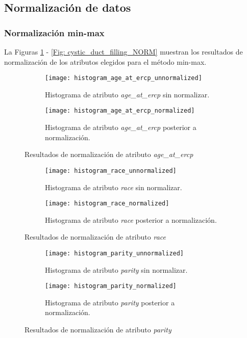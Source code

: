 \subsection{Normalización de datos}

\subsubsection{Normalización min-max}
La Figuras \ref{Fig: age_at_ercp_NORM} - \ref{Fig: cystic_duct_filling_NORM} muestran los resultados de normalización de los atributos elegidos para el método min-max.

\begin{figure}[!htb]
	\centering
	\begin{subfigure}[b]{0.4\textwidth}
		\centering
		\texttt{[image: histogram\_age\_at\_ercp\_unnormalized]}
		\caption{Histograma de atributo \emph{age\_at\_ercp} sin normalizar.}
	\end{subfigure}
	\hfill
	\begin{subfigure}[b]{0.4\textwidth}
		\centering
		\texttt{[image: histogram\_age\_at\_ercp\_normalized]}
		\caption{Histograma de atributo \emph{age\_at\_ercp} posterior a normalización.}
	\end{subfigure}
	\caption{Resultados de normalización de atributo \emph{age\_at\_ercp}}
	\label{Fig: age_at_ercp_NORM}
\end{figure}


\begin{figure}[!htb]
	\centering
	\begin{subfigure}[b]{0.4\textwidth}
		\centering
		\texttt{[image: histogram\_race\_unnormalized]}
		\caption{Histograma de atributo \emph{race} sin normalizar.}
	\end{subfigure}
	\hfill
	\begin{subfigure}[b]{0.4\textwidth}
		\centering
		\texttt{[image: histogram\_race\_normalized]}
		\caption{Histograma de atributo \emph{race} posterior a normalización.}
	\end{subfigure}
	\caption{Resultados de normalización de atributo \emph{race}}
	\label{Fig: race_NORM}
\end{figure}


\begin{figure}[!htb]
	\centering
	\begin{subfigure}[b]{0.4\textwidth}
		\centering
		\texttt{[image: histogram\_parity\_unnormalized]}
		\caption{Histograma de atributo \emph{parity} sin normalizar.}
	\end{subfigure}
	\hfill
	\begin{subfigure}[b]{0.4\textwidth}
		\centering
		\texttt{[image: histogram\_parity\_normalized]}
		\caption{Histograma de atributo \emph{parity} posterior a normalización.}
	\end{subfigure}
	\caption{Resultados de normalización de atributo \emph{parity}}
	\label{Fig: parity_NORM}
\end{figure}


